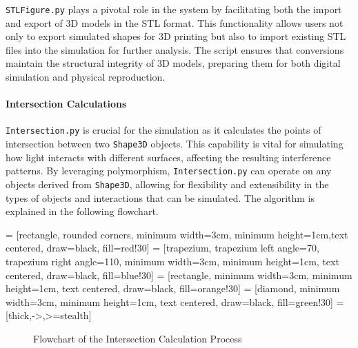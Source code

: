 \documentclass[../main.tex]{subfiles}
\begin{document}
\texttt{STLFigure.py} plays a pivotal role in the system by facilitating both the import and export of 3D models in the STL format. This functionality allows users not only to export simulated shapes for 3D printing but also to import existing STL files into the simulation for further analysis. The script ensures that conversions maintain the structural integrity of 3D models, preparing them for both digital simulation and physical reproduction.

\paragraph{Intersection Calculations}
\texttt{Intersection.py} is crucial for the simulation as it calculates the points of intersection between two \texttt{Shape3D} objects. This capability is vital for simulating how light interacts with different surfaces, affecting the resulting interference patterns. By leveraging polymorphism, \texttt{Intersection.py} can operate on any objects derived from \texttt{Shape3D}, allowing for flexibility and extensibility in the types of objects and interactions that can be simulated. The algorithm is explained in the following flowchart.

 = [rectangle, rounded corners, minimum width=3cm, minimum height=1cm,text centered, draw=black, fill=red!30]
 = [trapezium, trapezium left angle=70, trapezium right angle=110, minimum width=3cm, minimum height=1cm, text centered, draw=black, fill=blue!30]
 = [rectangle, minimum width=3cm, minimum height=1cm, text centered, draw=black, fill=orange!30]
 = [diamond, minimum width=3cm, minimum height=1cm, text centered, draw=black, fill=green!30]
 = [thick,->,>=stealth]

\begin{figure}[H]
\centering
{}
\caption{Flowchart of the Intersection Calculation Process}
\label{fig:flowchart1}
\end{figure}
\end{document}
